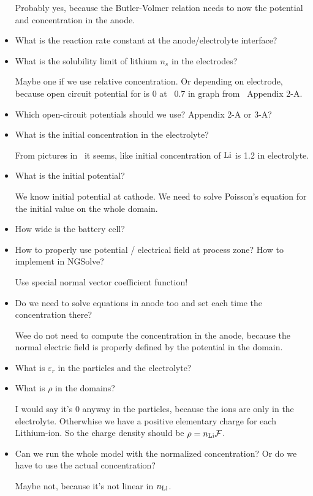 \documentclass[a4paper,11pt]{scrartcl}
\newcommand*{\Li}{\ce{Li}}
\newcommand*{\n}{n_{\Li}}
\newcommand*{\F}{\mathcal{F}}
\begin{document}
\begin{itemize}
  Probably yes, because the Butler-Volmer relation needs to now the potential
  and concentration in the anode.

\item What is the reaction rate constant at the anode/electrolyte interface?

\item What is the solubility limit of lithium $n_s$ in the electrodes?

  Maybe one if we use relative concentration. Or depending on electrode, because
  open circuit potential for  is 0 at ~0.7 in graph from~\cite{doyle95} Appendix 2-A.

\item Which open-circuit potentials should we use? Appendix 2-A or 3-A?

\item What is the initial concentration in the electrolyte?

  From pictures in~\cite{garcia05} it seems, like initial concentration of $\Li$
  is \num{1.2} in electrolyte.

\item What is the initial potential?

  We know initial potential at cathode.
  We need to solve Poisson's equation for the initial value on the whole domain.

\item How wide is the battery cell?

\item How to properly use potential / electrical field at process zone? How to
  implement in NGSolve?

  Use special normal vector coefficient function!

\item Do we need to solve equations in anode too and set each time the concentration there?

  Wee do not need to compute the concentration in the anode, because the normal
  electric field is properly defined by the potential in the domain.

\item What is $\varepsilon_r$ in the particles and the electrolyte?

\item What is $\rho$ in the domains?

  I would say it's 0 anyway in the particles, because the ions are only in the electrolyte.
  Otherwhise we have a positive elementary charge for each Lithium-ion.
  So the charge density should be $\rho = \n \F$.

\item Can we run the whole model with the normalized concentration?
  Or do we have to use the actual concentration?

  Maybe not, because it's not linear in $\n$.

\end{itemize}

{}

\end{document}
